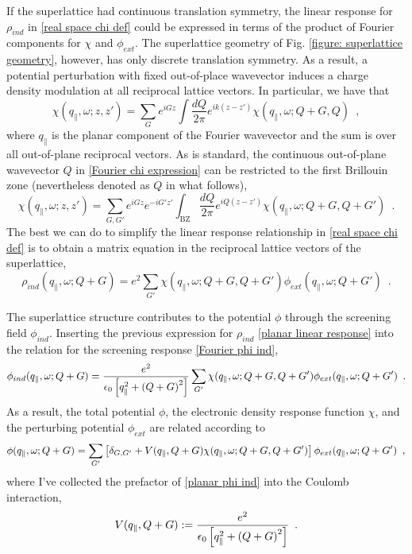 If the superlattice had continuous translation symmetry, the linear response for $\rho_{ind}$ in \eqref{real space chi def} could be expressed in terms of the product of Fourier components for $\chi$ and $\phi_{ext}$.  The superlattice geometry of Fig. \ref{figure: superlattice geometry}, however, has only discrete translation symmetry.  As a result, a potential perturbation with fixed out-of-place wavevector induces a charge density modulation at all reciprocal lattice vectors.  In particular, we have that
\begin{equation}
    \label{Fourier chi expression}
    \chi(q_\parallel,\omega;z,z') = \sum_G e^{iG z} \int \frac{dQ}{2\pi} e^{ik(z-z')}\chi(q_\parallel,\omega;Q+G,Q)
    \,\,\,,
\end{equation}
where $q_\parallel$ is the planar component of the Fourier wavevector and the sum is over all out-of-plane reciprocal vectors.  As is standard, the continuous out-of-plane wavevector $Q$ in \eqref{Fourier chi expression} can be restricted to the first Brillouin zone (nevertheless denoted as $Q$ in what follows),
\begin{equation}
    \label{Fourier chi G matrix}
    \chi(q_\parallel,\omega;z,z') = \sum_{G,G'} e^{iG z} e^{-i G' z'} \int_\text{BZ} \frac{dQ}{2\pi} e^{iQ(z-z')}\chi(q_\parallel,\omega;Q+G,Q+G')
    \,\,\,.
\end{equation}
The best we can do to simplify the linear response relationship in \eqref{real space chi def} is to obtain a matrix equation in the reciprocal lattice vectors of the superlattice,
\begin{equation}
    \label{planar linear response}
     \rho_{ind}(q_\parallel,\omega;Q+G) = e^2\sum_{G'}\chi(q_\parallel,\omega;Q+G, Q+G')
     \phi_{ext}(q_\parallel,\omega;Q+G')
     \,\,\,.
\end{equation}

The superlattice structure contributes to the potential $\phi$ through the screening field $\phi_{ind}$.  Inserting the previous expression for $\rho_{ind}$ \eqref{planar linear response} into the relation for the screening response \eqref{Fourier phi ind},
\begin{equation}
    \label{planar phi ind}
     \phi_{ind}(q_\parallel,\omega;Q+G) = \frac{e^2}{\epsilon_0\left[ q_\parallel^2+\left( Q+G\right)^2\right]} \sum_{G'}\chi(q_\parallel,\omega;Q+G, Q+G')
     \phi_{ext}(q_\parallel,\omega;Q+G')
     \,\,\,.
\end{equation}
As a result, the total potential $\phi$, the electronic density response function $\chi$, and the perturbing potential $\phi_{ext}$ are related according to
\begin{equation}
    \label{planar phi to phi ext relation}
    \phi(q_\parallel,\omega;Q+G) 
    =
    \sum_{G'}
    \left[
    \delta_{G,G'}
    +
    V(q_\parallel,Q+G)
    \chi(q_\parallel,\omega;Q+G, Q+G')
    \right]
    \phi_{ext}(q_\parallel,\omega;Q+ G')
    \,\,\,,
\end{equation}
where I've collected the prefactor of \eqref{planar phi ind} into the Coulomb interaction,
\begin{equation}
    \label{V def}
    V(q_\parallel,Q+G):=
    \frac{e^2}{\epsilon_0\left[ q_\parallel^2+\left( Q+G\right)^2\right]}
    \,\,\,.
\end{equation}

